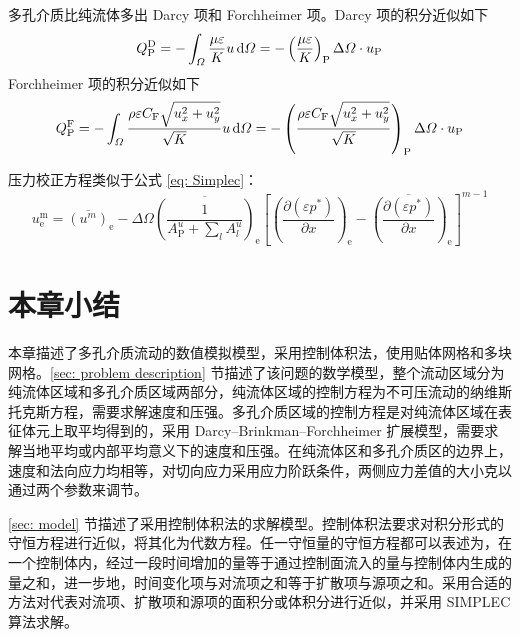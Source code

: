 多孔介质比纯流体多出 Darcy 项和 Forchheimer 项。Darcy 项的积分近似如下
\begin{equation}
	Q_{\mathrm{P}}^{\mathrm{D}} = 
	-\int_{\varOmega} \frac{\mu\varepsilon}{K}u \,\mathrm{d}\varOmega = 
	-\left(\frac{\mu\varepsilon}{K}\right)_{\mathrm{P}} \Delta\varOmega\cdot u_{\mathrm{P}}
\end{equation}
Forchheimer 项的积分近似如下
\begin{equation}
	Q_{\mathrm{P}}^{\mathrm{F}} = -\int_{\varOmega} \frac{\rho\varepsilon C_{\mathrm{F}}\sqrt{u_x^2+u_y^2}}{\sqrt K} u\,\mathrm{d}\varOmega = -\left(\frac{\rho\varepsilon C_{\mathrm{F}}\sqrt{u_x^2+u_y^2}}{\sqrt K}\right)_{\mathrm{P}} \Delta\varOmega\cdot u_{\mathrm{P}}
\end{equation}

压力校正方程类似于公式 \eqref{eq: Simplec}：
\begin{equation}
	u_{\mathrm{e}}^{\mathrm{m}} = \overline{(u^m)}_{\mathrm{e}} - \Delta\varOmega \overline{\left(\frac{1}{A_{\mathrm{P}}^u+\sum_lA_l^u}\right)}_{\mathrm{e}} \left[\left(\frac{\partial(\varepsilon p^*)}{\partial x}\right)_{\mathrm{e}}-\overline{\left(\frac{\partial(\varepsilon p^*)}{\partial x}\right)}_{\mathrm{e}}\right]^{m-1}
\end{equation}





\section{本章小结}

本章描述了多孔介质流动的数值模拟模型，采用控制体积法，使用贴体网格和多块网格。\ref{sec: problem description} 节描述了该问题的数学模型，整个流动区域分为纯流体区域和多孔介质区域两部分，纯流体区域的控制方程为不可压流动的纳维斯托克斯方程，需要求解速度和压强。多孔介质区域的控制方程是对纯流体区域在表征体元上取平均得到的，采用 Darcy–Brinkman–Forchheimer 扩展模型，需要求解当地平均或内部平均意义下的速度和压强。在纯流体区和多孔介质区的边界上，速度和法向应力均相等，对切向应力采用应力阶跃条件，两侧应力差值的大小克以通过两个参数来调节。


\ref{sec: model} 节描述了采用控制体积法的求解模型。控制体积法要求对积分形式的守恒方程进行近似，将其化为代数方程。任一守恒量的守恒方程都可以表述为，在一个控制体内，经过一段时间增加的量等于通过控制面流入的量与控制体内生成的量之和，进一步地，时间变化项与对流项之和等于扩散项与源项之和。采用合适的方法对代表对流项、扩散项和源项的面积分或体积分进行近似，并采用 SIMPLEC 算法求解。
